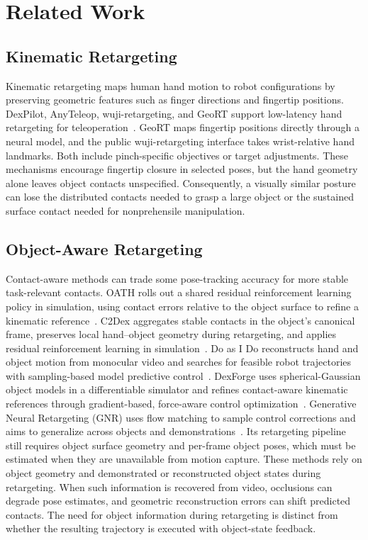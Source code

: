\section{Related Work}
\label{sec:related}

\subsection{Kinematic Retargeting}
Kinematic retargeting maps human hand motion to robot configurations by preserving geometric features such as finger directions and fingertip positions. DexPilot, AnyTeleop, wuji-retargeting, and GeoRT support low-latency hand retargeting for teleoperation~\cite{handa2019dexpilot,qin2023anyteleop,wuji2026retargeting,yin2025geort}. GeoRT maps fingertip positions directly through a neural model, and the public wuji-retargeting interface takes wrist-relative hand landmarks. Both include pinch-specific objectives or target adjustments. These mechanisms encourage fingertip closure in selected poses, but the hand geometry alone leaves object contacts unspecified. Consequently, a visually similar posture can lose the distributed contacts needed to grasp a large object or the sustained surface contact needed for nonprehensile manipulation.

\subsection{Object-Aware Retargeting}
Contact-aware methods can trade some pose-tracking accuracy for more stable task-relevant contacts. OATH rolls out a shared residual reinforcement learning policy in simulation, using contact errors relative to the object surface to refine a kinematic reference~\cite{sigurdson2026oath}. C2Dex aggregates stable contacts in the object's canonical frame, preserves local hand--object geometry during retargeting, and applies residual reinforcement learning in simulation~\cite{ren2026c2dex}. Do as I Do reconstructs hand and object motion from monocular video and searches for feasible robot trajectories with sampling-based model predictive control~\cite{paliwal2026doasido}. DexForge uses spherical-Gaussian object models in a differentiable simulator and refines contact-aware kinematic references through gradient-based, force-aware control optimization~\cite{wang2026dexforge}. Generative Neural Retargeting (GNR) uses flow matching to sample control corrections and aims to generalize across objects and demonstrations~\cite{gao2026gnr}. Its retargeting pipeline still requires object surface geometry and per-frame object poses, which must be estimated when they are unavailable from motion capture. These methods rely on object geometry and demonstrated or reconstructed object states during retargeting. When such information is recovered from video, occlusions can degrade pose estimates, and geometric reconstruction errors can shift predicted contacts. The need for object information during retargeting is distinct from whether the resulting trajectory is executed with object-state feedback.

